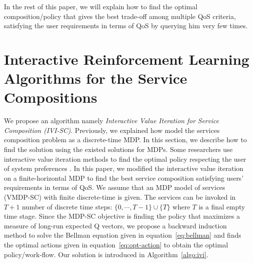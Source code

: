 \documentclass[10pt,journal,compsoc]{IEEEtran}
\begin{document}
In the rest of this paper, we will explain how to find the optimal composition/policy that gives the best trade-off among multiple QoS criteria, satisfying the user requirements in terms of QoS by querying him very few times. %

\section{Interactive Reinforcement Learning Algorithms for the Service Compositions}  \label{sec:Inter-Alg}
We propose an algorithm namely \emph{Interactive Value Iteration for Service Composition (IVI-SC)}. Previously, we explained how model the services composition problem as a discrete-time MDP. In this section, we describe how to find the solution using the existed solutions for MDPs. Some researchers use interactive value iteration methods to find the optimal policy respecting the user of system preferences \cite{weng:hal-00942290,alizadeh:hal-01358345}. In this paper, we modified the interactive value iteration on a finite-horizontal MDP to find the best service composition satisfying users' requirements in terms of QoS. We assume that an MDP model of services (VMDP-SC) with finite discrete-time is given. The services can be invoked in $T+1$ number of discrete time steps: $\{0, \cdots,T-1 \} \cup \{T\}$ where $T$ is a final empty time stage. %
Since the MDP-SC objective is finding the policy that maximizes a measure of long-run expected Q vectors, we propose a backward induction method to solve the Bellman equation given in equation~\ref{eq:bellman} and finds the optimal actions given in equation~\ref{eq:opt-action} to obtain the optimal policy/work-flow. Our solution is introduced in Algorithm~\ref{algo:ivi}.
\end{document}
